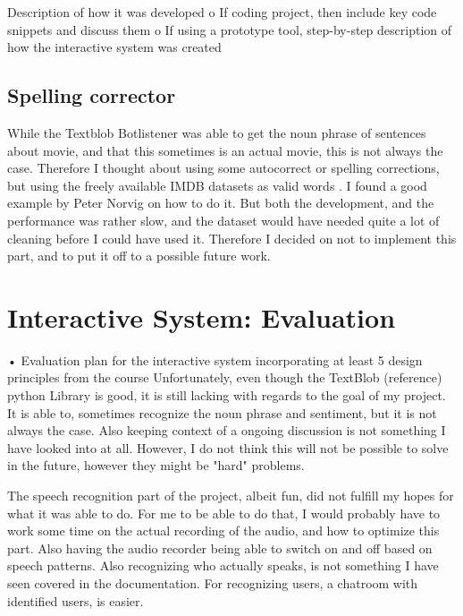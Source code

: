\documentclass[11pt,fleqn]{book} %
\begin{document}
Description of how it was developed
o If coding project, then include key code snippets and discuss them
o If using a prototype tool, step-by-step description of how the interactive system was created

\section{Spelling corrector}
While the Textblob Botlistener was able to get the noun phrase\cite{WikipediaNounPhrase} of sentences about movie, and that this sometimes is an actual movie, this is not always the case. Therefore I thought about using some autocorrect or spelling corrections, but using the freely available IMDB datasets as valid words \cite{IMDbAlternativeInterfaces}. I found a good example by Peter Norvig \cite{NorvigHowCorrector} on how to do it.
But both the development, and the performance was rather slow, and the dataset would have needed quite a lot of cleaning before I could have used it. Therefore I decided on not to implement this part, and to put it off to a possible future work.


\chapter{Interactive System: Evaluation}
• Evaluation plan for the interactive system incorporating at least 5 design principles from the course
Unfortunately, even though the TextBlob (reference) python Library is good, it is still lacking with regards to the goal of my project.
It is able to, sometimes recognize the noun phrase and sentiment, but it is not always the case.
Also keeping context of a ongoing discussion is not something I have looked into at all.
However, I do not think this will not be possible to solve in the future, however they might be "hard" problems.

The speech recognition part of the project, albeit fun, did not fulfill my hopes for what it was able to do. For me to be able to do that, I would probably have to work some time on the actual recording of the audio, and how to optimize this part. Also having the audio recorder being able to switch on and off based on speech patterns.
Also recognizing who actually speaks, is not something I have seen covered in the documentation.
For recognizing users, a chatroom with identified users, is easier.
\end{document}

